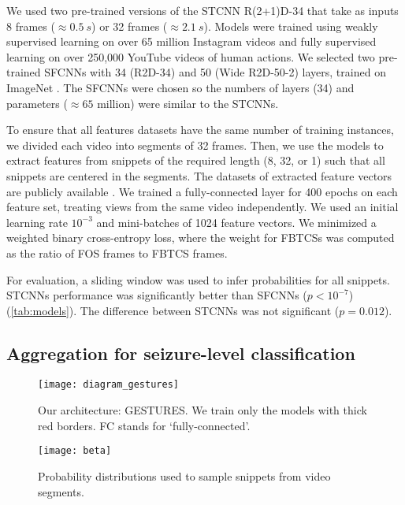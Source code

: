 We used two pre-trained versions of the \ac{STCNN} R(2+1)D-34 \cite{ghadiyaram_large-scale_2019} that take as inputs 8 frames ($\approx \SI{0.5}{s}$) or 32 frames ($\approx \SI{2.1}{s}$).
Models were trained using weakly supervised learning on over 65 million Instagram videos and fully supervised learning on over 250,000 YouTube videos of human actions.
We selected two pre-trained \acp{SFCNN} with 34 (R2D-34) and 50 (Wide R2D-50-2) layers, trained on ImageNet \cite{zagoruyko_wide_2016}.
The \acp{SFCNN} were chosen so the numbers of layers (34) and parameters ($\approx 65$ million) were similar to the \acp{STCNN}.

To ensure that all features datasets have the same number of training instances, we divided each video into segments of 32 frames.
Then, we use the models to extract features from snippets of the required length (8, 32, or 1) such that all snippets are centered in the segments.
The datasets of extracted feature vectors are publicly available \cite{perez-garcia_data_2021}.
We trained a fully-connected layer for 400 epochs on each feature set, treating views from the same video independently.
We used an initial learning rate $10 ^ {-3}$ and mini-batches of 1024 feature vectors.
We minimized a weighted binary cross-entropy loss, where the weight for \acp{FBTCS} was computed as the ratio of \ac{FOS} frames to \ac{FBTCS} frames.

For evaluation, a sliding window was used to infer probabilities for all snippets.
\acp{STCNN} performance was significantly better than \acp{SFCNN} ($p < 10 ^ {-7}$) (\cref{tab:models}).
The difference between \acp{STCNN} was not significant ($p = 0.012$).


\subsection{Aggregation for seizure-level classification}
\label{sec:exp_agg}

\begin{figure}
  \centering
  \texttt{[image: diagram\_gestures]}
  \caption[Overview of the GESTURES architecture]{
    Our architecture: \acf{GESTURES}.
    We train only the models with thick red borders.
    FC stands for `fully-connected'.
  }
  \label{fig:gestures}
\end{figure}



\begin{figure}
  \centering
  \texttt{[image: beta]}
  \caption[Probability distributions to sample snippets from video segments]{
    Probability distributions used to sample snippets from video segments.
  }
  \label{fig:betas}
\end{figure}



